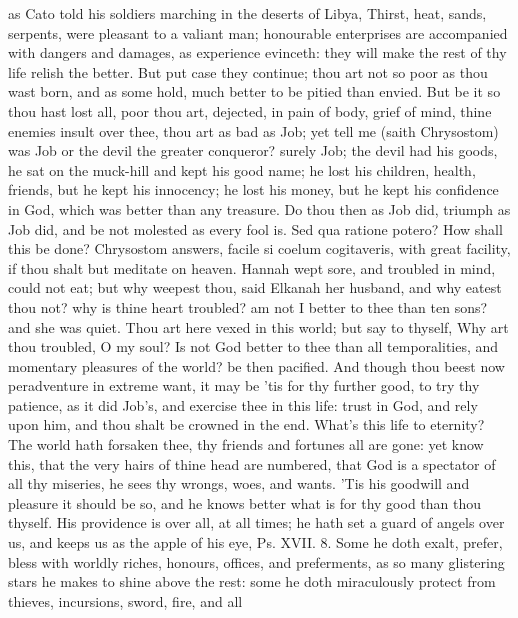{as Cato told his soldiers marching in the deserts of Libya, Thirst,
heat, sands, serpents, were pleasant to a valiant man; honourable
enterprises are accompanied with dangers and damages, as experience
evinceth: they will make the rest of thy life relish the better. But
put case they continue; thou art not so poor as thou wast born, and as
some hold, much better to be pitied than envied. But be it so thou hast
lost all, poor thou art, dejected, in pain of body, grief of mind,
thine enemies insult over thee, thou art as bad as Job; yet tell me
(saith Chrysostom) was Job or the devil the greater conqueror? surely
Job; the devil had his goods, he sat on the muck-hill and kept
his good name; he lost his children, health, friends, but he kept his
innocency; he lost his money, but he kept his confidence in God, which
was better than any treasure. Do thou then as Job did, triumph as Job
did, and be not molested as every fool is. Sed qua ratione
potero? How shall this be done? Chrysostom answers, facile si coelum
cogitaveris, with great facility, if thou shalt but meditate on heaven.
Hannah wept sore, and troubled in mind, could not eat; but why
weepest thou, said Elkanah her husband, and why eatest thou not? why is
thine heart troubled? am not I better to thee than ten sons? and she
was quiet. Thou art here vexed in this world; but say to thyself,
Why art thou troubled, O my soul? Is not God better to thee than all
temporalities, and momentary pleasures of the world? be then pacified.
And though thou beest now peradventure in extreme want, it may be
'tis for thy further good, to try thy patience, as it did Job's, and
exercise thee in this life: trust in God, and rely upon him, and thou
shalt be crowned in the end. What's this life to eternity? The
world hath forsaken thee, thy friends and fortunes all are gone: yet
know this, that the very hairs of thine head are numbered, that God is
a spectator of all thy miseries, he sees thy wrongs, woes, and wants.
'Tis his goodwill and pleasure it should be so, and he knows
better what is for thy good than thou thyself. His providence is over
all, at all times; he hath set a guard of angels over us, and keeps us
as the apple of his eye, Ps. XVII. 8. Some he doth exalt, prefer, bless
with worldly riches, honours, offices, and preferments, as so many
glistering stars he makes to shine above the rest: some he doth
miraculously protect from thieves, incursions, sword, fire, and all
}
